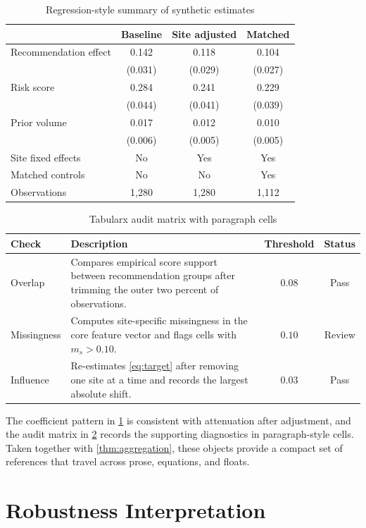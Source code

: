 \begin{table}[tbp]
\centering
\caption{Regression-style summary of synthetic estimates}
\label{tab:regression}
\begin{tabular}{@{}lccc@{}}
\toprule
 & Baseline & Site adjusted & Matched \\
\midrule
Recommendation effect & 0.142 & 0.118 & 0.104 \\
 & (0.031) & (0.029) & (0.027) \\
Risk score & 0.284 & 0.241 & 0.229 \\
 & (0.044) & (0.041) & (0.039) \\
Prior volume & 0.017 & 0.012 & 0.010 \\
 & (0.006) & (0.005) & (0.005) \\
\midrule
Site fixed effects & No & Yes & Yes \\
Matched controls & No & No & Yes \\
Observations & 1,280 & 1,280 & 1,112 \\
\bottomrule
\end{tabular}
\end{table}

\begin{table}[tbp]
\centering
\caption{Tabularx audit matrix with paragraph cells}
\label{tab:audit}
\begin{tabularx}{\linewidth}{@{}lXcc@{}}
\toprule
Check & Description & Threshold & Status \\
\midrule
Overlap & Compares empirical score support between recommendation groups after trimming the outer two percent of observations. & $0.08$ & Pass \\
Missingness & Computes site-specific missingness in the core feature vector and flags cells with $m_s>0.10$. & $0.10$ & Review \\
Influence & Re-estimates \cref{eq:target} after removing one site at a time and records the largest absolute shift. & $0.03$ & Pass \\
\bottomrule
\end{tabularx}
\end{table}

The coefficient pattern in \cref{tab:regression} is consistent with attenuation after adjustment, and the audit matrix in \cref{tab:audit} records the supporting diagnostics in paragraph-style cells. Taken together with \cref{thm:aggregation}, these objects provide a compact set of references that travel across prose, equations, and floats.

\section{Robustness Interpretation}

